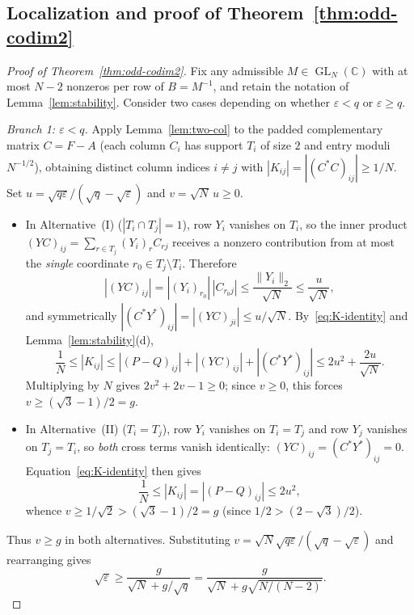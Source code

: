 \documentclass[11pt,reqno]{amsart}
\numberwithin{equation}{section}
\theoremstyle{definition}
\theoremstyle{remark}
\newcommand{\C}{\mathbb{C}}
\newcommand{\GL}{\operatorname{GL}}
\begin{document}
\subsection{Localization and proof of Theorem~\ref{thm:odd-codim2}}

\begin{proof}[Proof of Theorem~\ref{thm:odd-codim2}]
Fix any admissible $M\in\GL_N(\C)$ with at most $N-2$ nonzeros per row of $B=M^{-1}$, and retain the notation of Lemma~\ref{lem:stability}. Consider two cases depending on whether $\varepsilon < q$ or $\varepsilon \ge q$.

\smallskip
\noindent\emph{Branch 1: $\varepsilon < q$.}
Apply Lemma~\ref{lem:two-col} to the padded complementary matrix $C=F-A$ (each column $C_i$ has support $T_i$ of size $2$ and entry moduli $N^{-1/2}$), obtaining distinct column indices $i\neq j$ with $|K_{ij}| = |(C^*C)_{ij}| \ge 1/N$. Set $u=\sqrt{q\varepsilon}/(\sqrt{q}-\sqrt{\varepsilon})$ and $v=\sqrt{N}\,u\ge 0$.
\begin{itemize}[leftmargin=1.5em]
\item In Alternative~(I) ($|T_i\cap T_j|=1$), row $Y_i$ vanishes on $T_i$, so the inner product $(YC)_{ij} = \sum_{r\in T_j}(Y_i)_r C_{rj}$ receives a nonzero contribution from at most the \emph{single} coordinate $r_0\in T_j\setminus T_i$. Therefore
\[
|(YC)_{ij}| = |(Y_i)_{r_0}|\,|C_{r_0 j}| \le \frac{\|Y_i\|_2}{\sqrt{N}} \le \frac{u}{\sqrt{N}},
\]
and symmetrically $|(C^*Y^*)_{ij}| = |(YC)_{ji}| \le u/\sqrt{N}$. By~\eqref{eq:K-identity} and Lemma~\ref{lem:stability}(d),
\[
\frac{1}{N} \le |K_{ij}| \le |(P-Q)_{ij}| + |(YC)_{ij}| + |(C^*Y^*)_{ij}| \le 2u^2 + \frac{2u}{\sqrt{N}}.
\]
Multiplying by $N$ gives $2v^2 + 2v - 1 \ge 0$; since $v\ge 0$, this forces $v \ge (\sqrt{3}-1)/2 = g$.
\item In Alternative~(II) ($T_i = T_j$), row $Y_i$ vanishes on $T_i=T_j$ and row $Y_j$ vanishes on $T_j=T_i$, so \emph{both} cross terms vanish identically: $(YC)_{ij} = (C^*Y^*)_{ij} = 0$. Equation~\eqref{eq:K-identity} then gives
\[
\frac{1}{N} \le |K_{ij}| = |(P-Q)_{ij}| \le 2u^2,
\]
whence $v \ge 1/\sqrt{2} > (\sqrt{3}-1)/2 = g$ (since $1/2 > (2-\sqrt{3})/2$).
\end{itemize}
Thus $v \ge g$ in both alternatives. Substituting $v = \sqrt{N}\sqrt{q\varepsilon}/(\sqrt{q}-\sqrt{\varepsilon})$ and rearranging gives
\begin{equation}
\label{eq:sqrt-eps}
\sqrt{\varepsilon} \ge \frac{g}{\sqrt{N} + g/\sqrt{q}} = \frac{g}{\sqrt{N} + g\sqrt{N/(N-2)}}.
\end{equation}


\end{proof}
\end{document}
